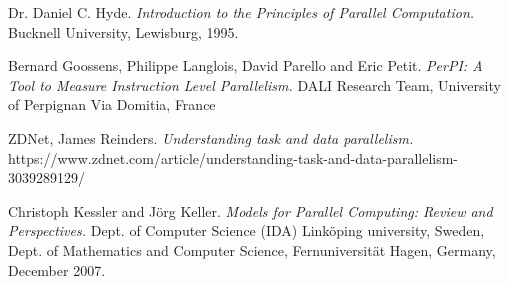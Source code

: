 \documentclass[a4paper]{article}
\begin{document}
\begin{thebibliography}{50}
		 Dr. Daniel C. Hyde. \emph{Introduction to the
			Principles of Parallel Computation.} Bucknell University, Lewisburg, 1995.
		
		 Bernard Goossens, Philippe Langlois, David Parello and Eric Petit. \emph{PerPI: A Tool to Measure Instruction Level Parallelism.} DALI Research Team, University of Perpignan Via Domitia, France
		
		 ZDNet, James Reinders. \emph{Understanding task and data parallelism.} https://www.zdnet.com/article/understanding-task-and-data-parallelism-3039289129/
		
		 Christoph Kessler and J\"{o}rg Keller. \emph{Models for Parallel Computing: Review and Perspectives.}  Dept. of Computer Science (IDA)
		Link\"{o}ping university, Sweden, Dept. of Mathematics and Computer Science, Fernuniversit\"{a}t Hagen, Germany, December 2007.
		
		
	\end{thebibliography}
\end{document}
